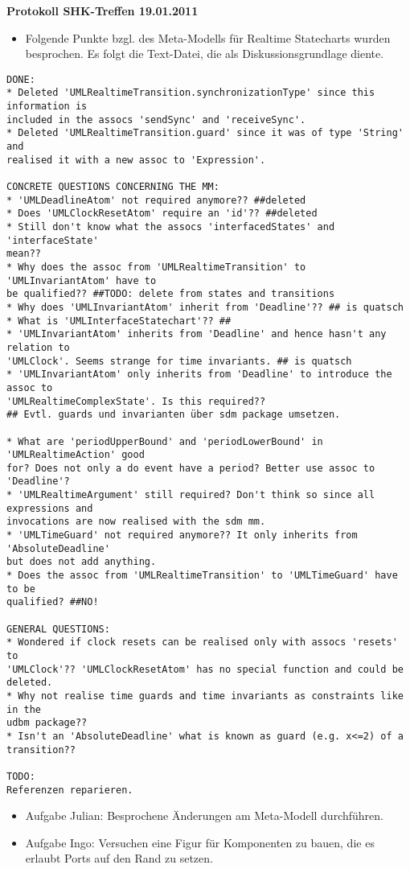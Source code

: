 \documentclass[11pt,a4paper]{article}
\begin{document}
\begin{center}

\textbf{\huge Protokoll SHK-Treffen 19.01.2011}\\[0.9cm]

\end{center}

\begin{itemize}
  \item Folgende Punkte bzgl. des Meta-Modells für Realtime Statecharts wurden
  besprochen. Es folgt die Text-Datei, die als Diskussionsgrundlage diente.
\end{itemize}

\begin{verbatim}
DONE:
* Deleted 'UMLRealtimeTransition.synchronizationType' since this information is
included in the assocs 'sendSync' and 'receiveSync'.
* Deleted 'UMLRealtimeTransition.guard' since it was of type 'String' and
realised it with a new assoc to 'Expression'.

CONCRETE QUESTIONS CONCERNING THE MM:
* 'UMLDeadlineAtom' not required anymore?? ##deleted
* Does 'UMLClockResetAtom' require an 'id'?? ##deleted
* Still don't know what the assocs 'interfacedStates' and 'interfaceState'
mean?? 
* Why does the assoc from 'UMLRealtimeTransition' to 'UMLInvariantAtom' have to
be qualified?? ##TODO: delete from states and transitions
* Why does 'UMLInvariantAtom' inherit from 'Deadline'?? ## is quatsch
* What is 'UMLInterfaceStatechart'?? ##
* 'UMLInvariantAtom' inherits from 'Deadline' and hence hasn't any relation to
'UMLClock'. Seems strange for time invariants. ## is quatsch
* 'UMLInvariantAtom' only inherits from 'Deadline' to introduce the assoc to
'UMLRealtimeComplexState'. Is this required??
## Evtl. guards und invarianten über sdm package umsetzen.

* What are 'periodUpperBound' and 'periodLowerBound' in 'UMLRealtimeAction' good
for? Does not only a do event have a period? Better use assoc to 'Deadline'?
* 'UMLRealtimeArgument' still required? Don't think so since all expressions and
invocations are now realised with the sdm mm.
* 'UMLTimeGuard' not required anymore?? It only inherits from 'AbsoluteDeadline'
but does not add anything.
* Does the assoc from 'UMLRealtimeTransition' to 'UMLTimeGuard' have to be
qualified? ##NO!

GENERAL QUESTIONS:
* Wondered if clock resets can be realised only with assocs 'resets' to
'UMLClock'?? 'UMLClockResetAtom' has no special function and could be deleted.
* Why not realise time guards and time invariants as constraints like in the
udbm package??
* Isn't an 'AbsoluteDeadline' what is known as guard (e.g. x<=2) of a
transition??

TODO:
Referenzen reparieren.
\end{verbatim}

\begin{itemize}
  \item Aufgabe Julian: Besprochene Änderungen am Meta-Modell durchführen.
  \item Aufgabe Ingo: Versuchen eine Figur für Komponenten zu bauen, die es
  erlaubt Ports auf den Rand zu setzen.
\end{itemize}
\end{document}

